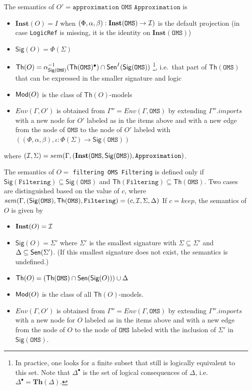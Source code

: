 \documentclass[10pt,fleqn,final]{scrreprt}
\newcommand{\cbs}[0]{\color{red}\xspace} %
\newcommand{\cbe}[0]{\color{black}\xspace} %
\newcommand*{\syntax}[1]{\texttt{#1}}
\newcommand{\Sig}{\mathsf{Sig}}
\renewcommand{\Th}{\mathsf{Th}}
\newcommand{\Inst}{\ensuremath{\mathbf{Inst}}}
\newenvironment{definitions}[0]{\medskip }{}
\begin{document}
\begin{definitions}
The semantics of $O' = \syntax{approximation OMS Approximation}$ is
\begin{itemize}
  \item $\Inst(O) = I$ when $(\Phi,\alpha,\beta) : \Inst(\syntax{OMS}) \to \cI)$ is the default projection (in case \syntax{LogicRef} is missing, it is the identity on $\Inst(\syntax{OMS})$)
  \item $\Sig(O) = \Phi(\Sigma)$
  \item $\Th(O) = \alpha^{-1}_{\Sig(\syntax{OMS})}(\Th(\syntax{OMS})^\bullet)\cap\Sen^I(\Sig(\syntax{OMS}))$%
\footnote{In  practice, one looks for a finite subset that still is logically equivalent to this set. Note that $\Delta^\bullet$ is the set of logical consequences of $\Delta$, i.e.\ $\Delta^\bullet = \mathbf{Th}(\Delta)$.}, i.e.\ that part of $\Th(\syntax{OMS})$ that can be expressed in the smaller signature and logic 
  \item $\mathsf{Mod}(O)$ is the class of $\Th(O)$-models
  \item $Env(\Gamma, O')$ is obtained from 
       $\Gamma'' = Env(\Gamma, \syntax{OMS})$
       by extending $\Gamma''.imports$
        with a new node for $O'$ labeled as in the items above
        and with a new edge from the node of $\syntax{OMS}$ to the node of $O'$ 
        labeled with $((\Phi,\alpha,\beta),\iota: \Phi(\Sigma) \to \Sig(\syntax{OMS}))$ 
\end{itemize}

\noindent where $(\cI,\Sigma) = sem(\Gamma, (\Inst(\syntax{OMS}, \Sig(\syntax{OMS})), \syntax{Approximation})$.


The semantics of $O =$ 
\syntax{filtering OMS Filtering} 
is
defined only if  $\Sig(\syntax{Filtering})\subseteq\Sig(\syntax{OMS})$ and $\Th(\syntax{Filtering})\subseteq\Th(\syntax{OMS})$.
\cbs Two cases are distinguished based\cbe on the value of $c$, 
where $sem(\Gamma, (\Sig(\syntax{OMS}), \Th(\syntax{OMS}), \syntax{Filtering})
= (c, \cI, \Sigma, \Delta)$ 
If $c = keep$, 
the semantics of $O$ is given by
\begin{itemize}
  \item $\Inst(O) = \cI$
  \item $\Sig(O) = \Sigma'$ where $\Sigma'$ is the smallest signature
with $\Sigma\subseteq\Sigma'$ and $\Delta\subseteq\mathsf{Sen}(\Sigma')$. ({If this smallest signature does not exist, the semantics is undefined.})
  \item $\Th(O) = (\Th(\syntax{OMS})\cap\Sen(\Sig(O)))\cup\Delta$
  \item $\mathsf{Mod}(O)$ is the class of all $\Th(O)$-models.
  \item $Env(\Gamma, O')$ is obtained from 
       $\Gamma'' = Env(\Gamma, \syntax{OMS})$
       by extending $\Gamma''.imports$
       with a new node for $O$ labeled as in the items above and
       with a new edge from the node of $O$ to the node of $\syntax{OMS}$
        labeled with the inclusion of $\Sigma'$ in $\Sig(\syntax{OMS})$.
\end{itemize}


\end{definitions}
\end{document}
